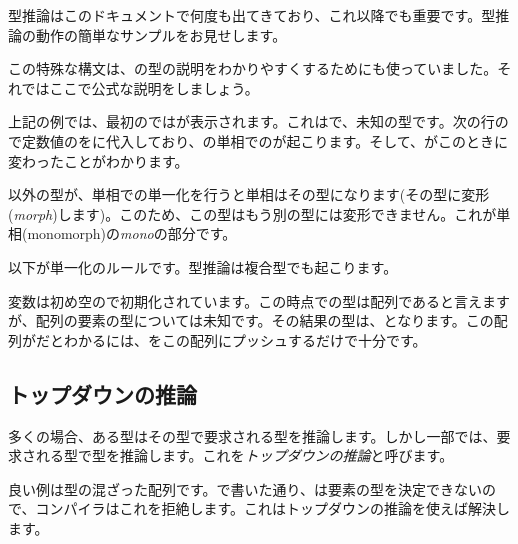 型推論はこのドキュメントで何度も出てきており、これ以降でも重要です。型推論の動作の簡単なサンプルをお見せします。

この特殊な構文は、の型の説明をわかりやすくするためにも使っていました。それではここで公式な説明をしましょう。


上記の例では、最初のではが表示されます。これはで、未知の型です。次の行ので定数値のをに代入しており、の単相でのが起こります。そして、がこのときに変わったことがわかります。

以外の型が、単相での単一化を行うと単相はその型になります(その型に変形(\emph{morph})します)。このため、この型はもう別の型には変形できません。これが単相(monomorph)の\emph{mono}の部分です。

以下が単一化のルールです。型推論は複合型でも起こります。


変数は初め空ので初期化されています。この時点での型は配列であると言えますが、配列の要素の型については未知です。その結果の型は、となります。この配列がだとわかるには、をこの配列にプッシュするだけで十分です。

\subsection{トップダウンの推論}
\label{type-system-top-down-inference}

多くの場合、ある型はその型で要求される型を推論します。しかし一部では、要求される型で型を推論します。これを\emph{トップダウンの推論}と呼びます。


良い例は型の混ざった配列です。で書いた通り、\expr{[1, "foo"]}は要素の型を決定できないので、コンパイラはこれを拒絶します。これはトップダウンの推論を使えば解決します。

